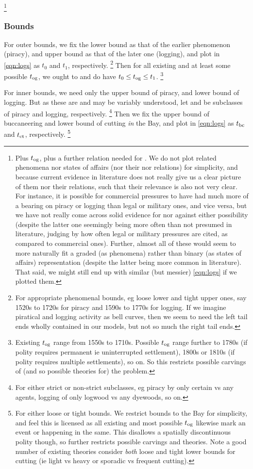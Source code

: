 		\footnote{Plus \(t_{\operatorname{og}}\), plus a further relation needed for . We do not plot related phenomena nor states of affairs (nor their  nor  relations) for simplicity, and because current evidence in literature does not really give us a clear picture of them nor their relations, such that their relevance is also not very clear. For instance, it is possible for commercial pressures to have had much more of a bearing on piracy or logging than legal or military ones, and vice versa, but we have not really come across solid evidence for nor against either possibility (despite the latter one seemingly being more often than not presumed in literature, judging by how often legal or military pressures are cited, as compared to commercial ones). Further, almost all of these would seem to more naturally fit a graded (as phenomena) rather than binary (as states of affairs) representation (despite the latter being more common in literature). That said, we might still end up with similar (but messier) \ref{eqn:logs} if we plotted them.}
		
		\subsubsection{Bounds}
		For outer bounds, we fix the lower bound as that of the earlier phenomenon (piracy), and upper bound as that of the later one (logging), and plot in \ref{eqn:logs} as  \(t_0\) and \(t_1\), respectively.%
		\footnote{For appropriate phenomenal bounds, eg loose lower and tight upper ones, say 1520s to 1720s for piracy and 1590s to 1770s for logging. If we imagine piratical and logging activity as bell curves, then we seem to need the left tail ends wholly contained in our models, but not so much the right tail ends.}
		Then for all existing and at least some possible \(t_{\operatorname{og}}\), we ought to and do have \(t_0 \leq t_{\operatorname{og}} \leq t_1\).%
		\footnote{Existing \(t_{\operatorname{og}}\) range from 1550s to 1710s. Possible \(t_{\operatorname{og}}\) range further to 1780s (if polity requires permanent ie uninterrupted settlement), 1800s or 1810s (if polity requires multiple settlements), so on. So this restricts possible carvings of (and so possible theories for) the problem.}
		
		For inner bounds, we need only the upper bound of piracy, and lower bound of logging. But as these are and may be variably understood, let  and  be subclasses of piracy and logging, respectively.%
		\footnote{For either strict or non-strict subclasses, eg piracy by only certain vs any agents, logging of only logwood vs any dyewoods, so on.}
		Then we fix the upper bound of buccaneering and lower bound of cutting \emph{in} the Bay, and plot in \ref{eqn:logs} as \(t_{\operatorname{bc}}\) and \(t_{\operatorname{ct}}\), respectively.%
		\footnote{For either loose or tight bounds. We restrict bounds to the Bay for simplicity, and feel this is licensed as all existing and most possible \(t_{\operatorname{og}}\) likewise mark an event or happening in the same. This disallows a spatially discontinuous polity though, so further restricts possible carvings and theories. Note a good number of existing theories consider \emph{both} loose and tight lower bounds for cutting (ie light vs heavy or sporadic vs frequent cutting).}
		
